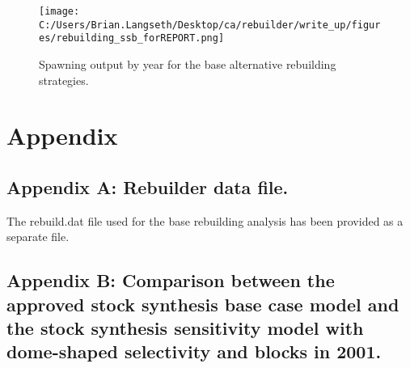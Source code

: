 \documentclass[11pt,
  english,
  a4paper,
]{article}
\begin{document}

\begin{figure}
\centering
\texttt{[image: C:/Users/Brian.Langseth/Desktop/ca/rebuilder/write\_up/figures/rebuilding\_ssb\_forREPORT.png]}
\caption{Spawning output by year for the base alternative rebuilding strategies.\label{fig:ssb-fig}}
\end{figure}

\tagmcend\tagstructend

\clearpage


\hypertarget{appendix}{%
\section{Appendix}\label{appendix}}

\leavevmode\tagmcend\tagstructend


\hypertarget{append_a}{%
\subsection{Appendix A: Rebuilder data file.}\label{append_a}}

\leavevmode\tagmcend\tagstructend


The rebuild.dat file used for the base rebuilding analysis has been provided as a separate file.

\leavevmode\tagmcend\tagstructend\par

\clearpage


\hypertarget{append_b}{%
\subsection{Appendix B: Comparison between the approved stock synthesis base case model and the stock synthesis sensitivity model with dome-shaped selectivity and blocks in 2001.}\label{append_b}}

\leavevmode\tagmcend\tagstructend


\end{document}
